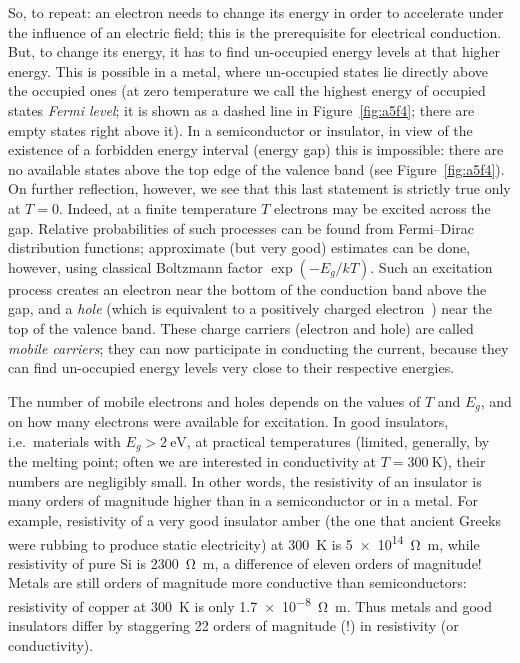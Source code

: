 \documentclass[11pt,a4paper]{article}
\begin{document}
So, to repeat: an electron needs to change its energy in order to accelerate under
the influence of an electric field; this is the prerequisite for electrical
conduction. But, to change its energy, it has to find un-occupied energy levels at
that higher energy. This is possible in a metal, where un-occupied states lie
directly above the occupied ones (at zero temperature we call the highest energy of
occupied states \emph{Fermi level}; it is shown as a dashed line in
Figure~\ref{fig:a5f4}; there are empty states right above it). In a semiconductor
or insulator, in view of the existence of a forbidden energy interval (energy gap)
this is impossible: there are no available states above the top edge of the valence
band (see Figure~\ref{fig:a5f4}). On further reflection, however, we see that this
last statement is strictly true only at $T = 0$. Indeed, at a finite temperature
$T$ electrons may be excited across the gap. Relative probabilities of such
processes can be found from Fermi--Dirac distribution functions; approximate (but
very good) estimates can be done, however, using classical Boltzmann factor
$\exp(-E_g/kT)$. Such an excitation process creates an electron near the bottom of
the conduction band above the gap, and a \emph{hole} (which is equivalent to a
positively charged electron~\cite{ref:papon}) near the top of the valence band.
These charge carriers (electron and hole) are called \emph{mobile carriers}; they
can now participate in conducting the current, because they can find un-occupied
energy levels very close to their respective energies.

The number of mobile electrons and holes depends on the values of $T$ and $E_g$,
and on how many electrons were available for excitation. In good insulators, i.e.\
materials with $E_g > \SI{2}{\electronvolt}$, at practical temperatures (limited,
generally, by the melting point; often we are interested in conductivity at
$T = \SI{300}{\kelvin}$), their numbers are negligibly small. In other words, the
resistivity of an insulator is many orders of magnitude higher than in a
semiconductor or in a metal. For example, resistivity of a very good insulator
amber (the one that ancient Greeks were rubbing to produce static electricity) at
\SI{300}{\kelvin} is \SI{5e14}{\ohm\metre}, while resistivity of pure Si is
\SI{2300}{\ohm\metre}, a difference of eleven orders of magnitude! Metals are
still orders of magnitude more conductive than semiconductors: resistivity of
copper at \SI{300}{\kelvin} is only \SI{1.7e-8}{\ohm\metre}. Thus metals and good
insulators differ by staggering 22 orders of magnitude (!) in resistivity (or
conductivity).
\end{document}
